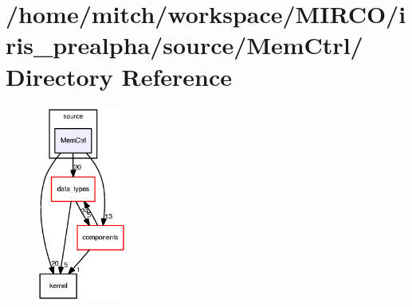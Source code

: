 \section{/home/mitch/workspace/MIRCO/iris\_\-prealpha/source/MemCtrl/ Directory Reference}
\label{dir_68414c78e771b0295ac632c0b2554c13}


\nopagebreak
\begin{figure}[H]
\begin{center}
\leavevmode
\includegraphics[width=83pt]{dir_68414c78e771b0295ac632c0b2554c13_dep}
\end{center}
\end{figure}
